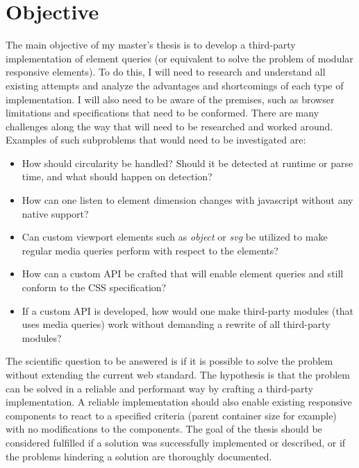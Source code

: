\documentclass[oneside,a4paper,11pt]{kth-mag}
\begin{document}
\section*{Objective}
The main objective of my master's thesis is to develop a third-party implementation of element queries (or equivalent to solve the problem of modular responsive elements). To do this, I will need to research and understand all existing attempts and analyze the advantages and shortcomings of each type of implementation. I will also need to be aware of the premises, such as browser limitations and specifications that need to be conformed. There are many challenges along the way that will need to be researched and worked around. Examples of such subproblems that would need to be investigated are:
\begin{itemize}
\item How should circularity be handled? Should it be detected at runtime or parse time, and what should happen on detection?
\item How can one listen to element dimension changes with javascript without any native support?
\item Can custom viewport elements such as \emph{object} or \emph{svg} be utilized to make regular media queries perform with respect to the elements?
\item How can a custom API be crafted that will enable element queries and still conform to the CSS specification?
\item If a custom API is developed, how would one make third-party modules (that uses media queries) work without demanding a rewrite of all third-party modules?
\end{itemize}
The scientific question to be answered is if it is possible to solve the problem  without extending the current web standard. The hypothesis is that the problem can be solved in a reliable and performant way by crafting a third-party implementation. A reliable implementation should also enable existing responsive components to react to a specified criteria (parent container size for example) with no modifications to the components. The goal of the thesis should be considered fulfilled if a solution was successfully implemented or described, or if the problems hindering a solution are thoroughly documented.
\end{document}
